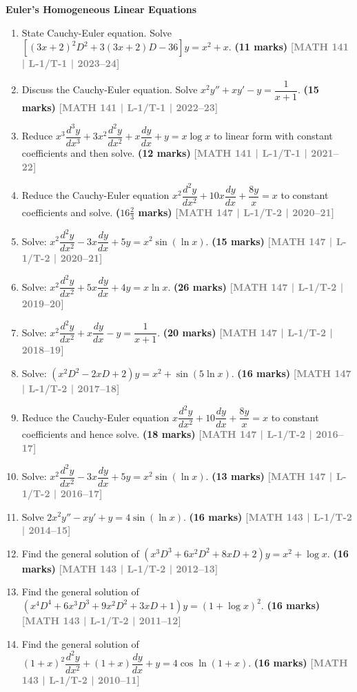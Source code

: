 \documentclass[12pt,a4paper]{article}
\newcommand{\yr}[1]{\hfill\textcolor{gray}{\small\textbf{[#1]}}}
\newcommand{\mk}[1]{\textcolor{orange!70!black}{\small\textbf{(#1 marks)}}}
\newcommand{\subtopic}[2]{%
  \vspace{10pt}
  \noindent\begin{tcolorbox}[colback=#1!8,colframe=#1,boxrule=0.6pt,arc=4pt,
    left=6pt,right=6pt,top=4pt,bottom=4pt]
    \small\bfseries\textcolor{#1}{#2}
  \end{tcolorbox}
  \vspace{2pt}
}
\begin{document}
\subtopic{cC}{Euler's Homogeneous Linear Equations}
\label{sub:s3-euler}

\begin{enumerate}\item State Cauchy-Euler equation. Solve $[(3x+2)^{2}D^{2}+3(3x+2)D-36]y=x^{2}+x$.
\mk{11} \yr{MATH 141 | L-1/T-1 | 2023--24}

\item Discuss the Cauchy-Euler equation. Solve $x^{2}y''+xy'-y=\dfrac{1}{x+1}$.
\mk{15} \yr{MATH 141 | L-1/T-1 | 2022--23}

\item Reduce $x^{3}\dfrac{d^{3}y}{dx^{3}}+3x^{2}\dfrac{d^{2}y}{dx^{2}}+x\dfrac{dy}{dx}+y=x\log x$ to linear form with constant coefficients and then solve.
\mk{12} \yr{MATH 141 | L-1/T-1 | 2021--22}

\item Reduce the Cauchy-Euler equation $x^{2}\dfrac{d^{2}y}{dx^{2}}+10x\dfrac{dy}{dx}+\dfrac{8y}{x}=x$ to constant coefficients and solve.
\mk{$16\tfrac{2}{3}$} \yr{MATH 147 | L-1/T-2 | 2020--21}

\item Solve: $x^{2}\dfrac{d^{2}y}{dx^{2}}-3x\dfrac{dy}{dx}+5y=x^{2}\sin(\ln x)$.
\mk{15} \yr{MATH 147 | L-1/T-2 | 2020--21}

\item Solve: $x^{2}\dfrac{d^{2}y}{dx^{2}}+5x\dfrac{dy}{dx}+4y=x\ln x$.
\mk{26} \yr{MATH 147 | L-1/T-2 | 2019--20}

\item Solve: $x^{2}\dfrac{d^{2}y}{dx^{2}}+x\dfrac{dy}{dx}-y=\dfrac{1}{x+1}$.
\mk{20} \yr{MATH 147 | L-1/T-2 | 2018--19}

\item Solve: $(x^{2}D^{2}-2xD+2)y=x^{2}+\sin(5\ln x)$.
\mk{16} \yr{MATH 147 | L-1/T-2 | 2017--18}

\item Reduce the Cauchy-Euler equation $x\dfrac{d^{2}y}{dx^{2}}+10\dfrac{dy}{dx}+\dfrac{8y}{x}=x$ to constant coefficients and hence solve.
\mk{18} \yr{MATH 147 | L-1/T-2 | 2016--17}

\item Solve: $x^{2}\dfrac{d^{2}y}{dx^{2}}-3x\dfrac{dy}{dx}+5y=x^{2}\sin(\ln x)$.
\mk{13} \yr{MATH 147 | L-1/T-2 | 2016--17}

\item Solve $2x^{2}y''-xy'+y=4\sin(\ln x)$.
\mk{16} \yr{MATH 143 | L-1/T-2 | 2014--15}

\item Find the general solution of $(x^{3}D^{3}+6x^{2}D^{2}+8xD+2)y=x^{2}+\log x$.
\mk{16} \yr{MATH 143 | L-1/T-2 | 2012--13}

\item Find the general solution of $(x^{4}D^{4}+6x^{3}D^{3}+9x^{2}D^{2}+3xD+1)y=(1+\log x)^{2}$.
\mk{16} \yr{MATH 143 | L-1/T-2 | 2011--12}

\item Find the general solution of $(1+x)^{2}\dfrac{d^{2}y}{dx^{2}}+(1+x)\dfrac{dy}{dx}+y=4\cos\ln(1+x)$.
\mk{16\textonehalf} \yr{MATH 143 | L-1/T-2 | 2010--11}

\end{enumerate}
\end{document}
